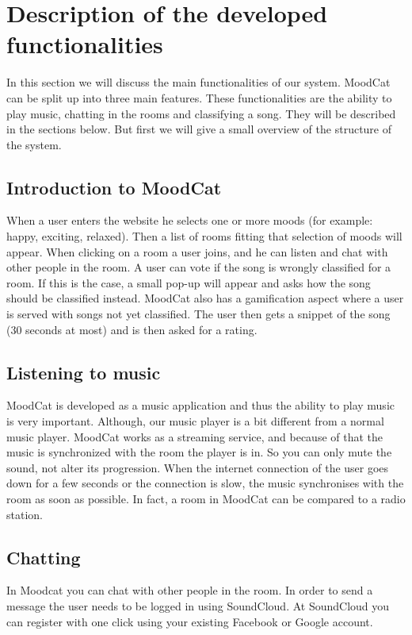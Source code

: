 \chapter{Description of the developed functionalities}

In this section we will discuss the main functionalities of our system.
MoodCat can be split up into three main features.
These functionalities are the ability to play music, chatting in the rooms and classifying a song.
They will be described in the sections below.
But first we will give a small overview of the structure of the system.

\section{Introduction to MoodCat}
When a user enters the website he selects one or more moods (for example: happy, exciting, relaxed).
Then a list of rooms fitting that selection of moods will appear.
When clicking on a room a user joins, and he can listen and chat with other people in the room.
A user can vote if the song is wrongly classified for a room.
If this is the case, a small pop-up will appear and asks how the song should be classified instead.
MoodCat also has a gamification aspect where a user is served with songs not yet classified. The user then gets a snippet of the song (30 seconds at most) and is then asked for a rating.

\section{Listening to music}
MoodCat is developed as a music application and thus the ability to play music is very important.
Although, our music player is a bit different from a normal music player.
MoodCat works as a streaming service, and because of that the music is synchronized with the room the player is in.  
So you can only mute the sound, not alter its progression.
When the internet connection of the user goes down for a few seconds or the connection is slow, the music synchronises with the room as soon as possible.
In fact, a room in MoodCat can be compared to a radio station.

\section{Chatting}
In Moodcat you can chat with other people in the room.
In order to send a message the user needs to be logged in using SoundCloud.
At SoundCloud you can register with one click using your existing Facebook or Google account.


